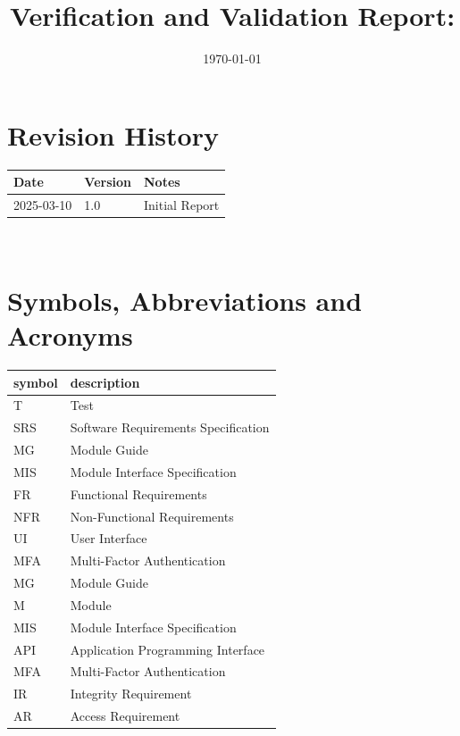 \documentclass[12pt, titlepage]{article}
\begin{document}
\title{Verification and Validation Report: \progname} 
\author{\authname}
\date{\today}
	
\maketitle


\section{Revision History}

\begin{tabularx}{\textwidth}{p{3cm}p{2cm}X}
\toprule {\bf Date} & {\bf Version} & {\bf Notes}\\
\midrule
2025-03-10 & 1.0 & Initial Report\\

\bottomrule
\end{tabularx}

~\newpage

\section{Symbols, Abbreviations and Acronyms}

\renewcommand{\arraystretch}{1.2}
\begin{tabular}{l l} 
  \toprule		
  \textbf{symbol} & \textbf{description}\\
  \midrule 
  T & Test\\
  SRS & Software Requirements Specification\\
  MG & Module Guide\\
  MIS & Module Interface Specification\\
  FR & Functional Requirements\\
  NFR & Non-Functional Requirements\\
  UI & User Interface\\
  MFA & Multi-Factor Authentication \\
  MG & Module Guide \\
  M & Module \\
  MIS & Module Interface Specification \\
  API & Application Programming Interface \\
  MFA & Multi-Factor Authentication \\
  IR & Integrity Requirement\\
  AR & Access Requirement\\
  \bottomrule
\end{tabular}\\
\end{document}
